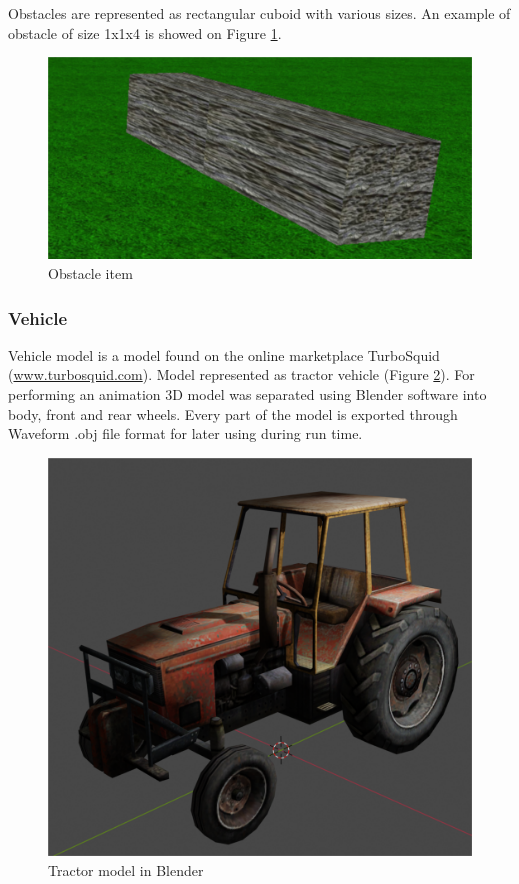 \documentclass[12pt]{article}
\begin{document}
\par
Obstacles are represented as rectangular cuboid with various sizes. An example of obstacle of size 1x1x4 is showed on Figure \ref{obstacle_item}.

\begin{figure}[h!]
\begin{center}
\includegraphics[scale=0.8]{images/obstacle2.png}
\end{center}
\caption{Obstacle item}
\label{obstacle_item}
\end{figure}

\subsubsection{Vehicle}
Vehicle model is a model found on the online marketplace TurboSquid (\url{www.turbosquid.com}). Model represented as tractor vehicle (Figure \ref{tractor1}). For performing an animation 3D model was separated using Blender software into body, front and rear wheels. Every part of the model is exported through Waveform .obj file format for later using during run time. 

\begin{figure}[h!]
\begin{center}
\includegraphics[scale=0.8]{images/tractor_blender.png}
\end{center}
\caption{Tractor model in Blender}
\label{tractor1}
\end{figure}
\end{document}
